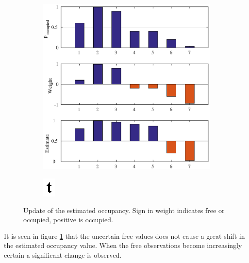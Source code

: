 \begin{figure}[htbp]

	\begin{subfigure}[t]{1\textwidth}
		\centering
		\includegraphics[width=1\linewidth]{chapters/cost_interpretation/figures/update}
	\end{subfigure}
	\begin{subfigure}[t]{1\textwidth}
		\centering
		\includegraphics[scale=1]{chapters/cost_interpretation/figures/the_t}
	\end{subfigure}
	\vspace{10pt}
	\caption{Update of the estimated occupancy. Sign in weight indicates free or occupied, positive is occupied. }
	\label{fig:cost_update}
\end{figure}

It is seen in figure \ref{fig:cost_update} that the uncertain free values does not cause a great shift in the estimated occupancy value. When the free observations become increasingly certain a significant change is observed. 

